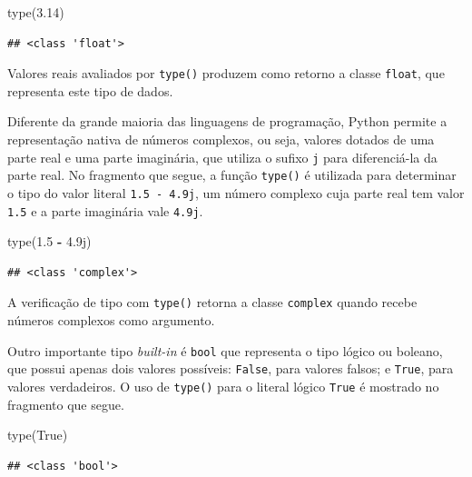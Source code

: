 \documentclass[
]{book}
\newenvironment{Shaded}{\begin{snugshade}}{\end{snugshade}}
\newcommand{\BuiltInTok}[1]{#1}
\newcommand{\FloatTok}[1]{\textcolor[rgb]{0.00,0.00,0.81}{#1}}
\newcommand{\NormalTok}[1]{#1}
\newcommand{\OperatorTok}[1]{\textcolor[rgb]{0.81,0.36,0.00}{\textbf{#1}}}
\newcommand{\OtherTok}[1]{\textcolor[rgb]{0.56,0.35,0.01}{#1}}
\newcommand{\VariableTok}[1]{\textcolor[rgb]{0.00,0.00,0.00}{#1}}
\begin{document}
\begin{Shaded}
\begin{Highlighting}[]
\BuiltInTok{type}\NormalTok{(}\FloatTok{3.14}\NormalTok{)}
\end{Highlighting}
\end{Shaded}

\begin{verbatim}
## <class 'float'>
\end{verbatim}

Valores reais avaliados por \texttt{type()} produzem como retorno a classe \texttt{float}, que representa este tipo de dados.

Diferente da grande maioria das linguagens de programação, Python permite a representação nativa de números complexos, ou seja, valores dotados de uma parte real e uma parte imaginária, que utiliza o sufixo \texttt{j} para diferenciá-la da parte real. No fragmento que segue, a função \texttt{type()} é utilizada para determinar o tipo do valor literal \texttt{1.5\ -\ 4.9j}, um número complexo cuja parte real tem valor \texttt{1.5} e a parte imaginária vale \texttt{4.9j}.

\begin{Shaded}
\begin{Highlighting}[]
\BuiltInTok{type}\NormalTok{(}\FloatTok{1.5} \OperatorTok{{-}} \OtherTok{4.9j}\NormalTok{)}
\end{Highlighting}
\end{Shaded}

\begin{verbatim}
## <class 'complex'>
\end{verbatim}

A verificação de tipo com \texttt{type()} retorna a classe \texttt{complex} quando recebe números complexos como argumento.

Outro importante tipo \emph{built-in} é \texttt{bool} que representa o tipo lógico ou boleano, que possui apenas dois valores possíveis: \texttt{False}, para valores falsos; e \texttt{True}, para valores verdadeiros. O uso de \texttt{type()} para o literal lógico \texttt{True} é mostrado no fragmento que segue.

\begin{Shaded}
\begin{Highlighting}[]
\BuiltInTok{type}\NormalTok{(}\VariableTok{True}\NormalTok{)}
\end{Highlighting}
\end{Shaded}

\begin{verbatim}
## <class 'bool'>
\end{verbatim}
\end{document}
